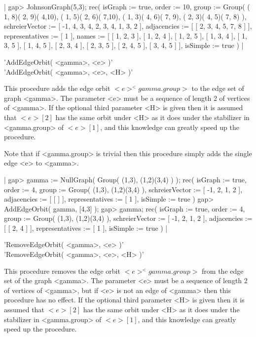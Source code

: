 |    gap> JohnsonGraph(5,3);
    rec(
      isGraph := true,
      order := 10,
      group := Group( ( 1, 8)( 2, 9)( 4,10), ( 1, 5)( 2, 6)( 7,10),
        ( 1, 3)( 4, 6)( 7, 9), ( 2, 3)( 4, 5)( 7, 8) ),
      schreierVector := [ -1, 4, 3, 4, 2, 3, 4, 1, 3, 2 ],
      adjacencies := [ [ 2, 3, 4, 5, 7, 8 ] ],
      representatives := [ 1 ],
      names := [ [ 1, 2, 3 ], [ 1, 2, 4 ], [ 1, 2, 5 ], [ 1, 3, 4 ],
          [ 1, 3, 5 ], [ 1, 4, 5 ], [ 2, 3, 4 ], [ 2, 3, 5 ],
          [ 2, 4, 5 ], [ 3, 4, 5 ] ],
      isSimple := true ) |


'AddEdgeOrbit( <gamma>, <e> )' \\
'AddEdgeOrbit( <gamma>, <e>, <H> )'

This procedure adds the edge orbit $<e>^<gamma.group>$ to the edge set of
graph <gamma>.   The  parameter  <e> must be a  sequence  of length 2  of
vertices of  <gamma>.  If the optional third parameter <H>  is given then
it is assumed that $<e>[2]$ has the same orbit under <H> as it does under
the  stabilizer  in <gamma.group>  of $<e>[1]$,  and  this knowledge  can
greatly speed up the procedure.

Note that if <gamma.group> is trivial then this procedure simply adds the
single edge <e> to <gamma>.

|    gap> gamma := NullGraph( Group( (1,3), (1,2)(3,4) ) );
    rec(
      isGraph := true,
      order := 4,
      group := Group( (1,3), (1,2)(3,4) ),
      schreierVector := [ -1, 2, 1, 2 ],
      adjacencies := [ [  ] ],
      representatives := [ 1 ],
      isSimple := true )
    gap> AddEdgeOrbit( gamma, [4,3] );
    gap> gamma;
    rec(
      isGraph := true,
      order := 4,
      group := Group( (1,3), (1,2)(3,4) ),
      schreierVector := [ -1, 2, 1, 2 ],
      adjacencies := [ [ 2, 4 ] ],
      representatives := [ 1 ],
      isSimple := true ) |


'RemoveEdgeOrbit( <gamma>, <e> )' \\
'RemoveEdgeOrbit( <gamma>, <e>, <H> )'

This procedure removes the  edge  orbit $<e>^<gamma.group>$ from the edge
set of the graph <gamma>.  The parameter <e> must be a sequence of length
2 of vertices of <gamma>, but  if <e> is not an edge of <gamma> then this
procedure has no  effect. If the optional  third  parameter  <H> is given
then  it is assumed that $<e>[2]$ has the same orbit under <H> as it does
under the stabilizer in <gamma.group> of $<e>[1]$, and this knowledge can
greatly speed up the procedure.


